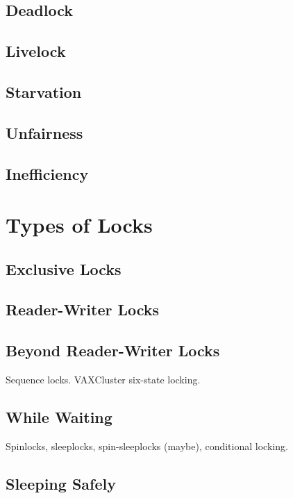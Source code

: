 \subsection{Deadlock}
\label{sec:locking:Deadlock}

\subsection{Livelock}
\label{sec:locking:Livelock}

\subsection{Starvation}
\label{sec:locking:Starvation}

\subsection{Unfairness}
\label{sec:locking:Unfairness}

\subsection{Inefficiency}
\label{sec:locking:Inefficiency}

\section{Types of Locks}
\label{sec:locking:Types of Locks}

\subsection{Exclusive Locks}
\label{sec:locking:Exclusive Locks}

\subsection{Reader-Writer Locks}
\label{sec:locking:Reader-Writer Locks}

\subsection{Beyond Reader-Writer Locks}
\label{sec:locking:Beyond Reader-Writer Locks}

Sequence locks.  VAXCluster six-state locking.

\subsection{While Waiting}
\label{sec:locking:While Waiting}

Spinlocks, sleeplocks, spin-sleeplocks (maybe), conditional locking.

\subsection{Sleeping Safely}
\label{sec:locking:Sleeping Safely}


